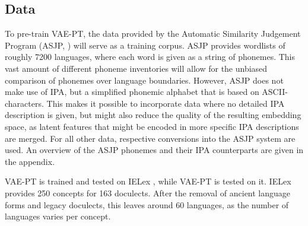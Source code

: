 \documentclass[6pt]{article}
\begin{document}
\subsection{Data}
To pre-train VAE-PT,  the data provided by the Automatic Similarity Judgement Program (ASJP, \cite{wichmann2010asjp}) will serve as a training corpus. ASJP provides wordlists of roughly 7200 languages, where each word is given as a string of phonemes. This vast amount of different phoneme inventories will allow for the unbiased comparison of phonemes over language boundaries. However, ASJP does not make use of IPA, but a simplified phonemic alphabet that is based on ASCII-characters. This makes it possible to incorporate data where no detailed IPA description is given, but might also reduce the quality of the resulting embedding space, as latent features that might be encoded in more specific IPA descriptions are merged. For all other data, respective conversions into the ASJP system are used.  An overview of the ASJP phonemes and their IPA counterparts are given in the appendix.

VAE-PT is trained and tested on IELex \citep{dunn2012indo}, while VAE-PT is tested on it. IELex provides 250 concepts for 163 doculects. After the removal of ancient language forms and legacy doculects, this leaves around 60 languages, as the number of languages varies per concept.
\end{document}
